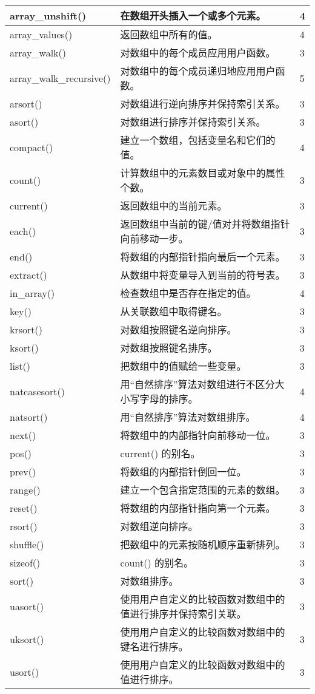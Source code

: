 \begin{longtable}{|m{120pt}|m{250pt}|m{20pt}|}
\hline
array\_unshift()					&在数组开头插入一个或多个元素。	&4\\
\hline
array\_values()					&返回数组中所有的值。	&4\\
\hline
array\_walk()					&对数组中的每个成员应用用户函数。	&3\\
\hline
array\_walk\_recursive()		&对数组中的每个成员递归地应用用户函数。	&5\\
\hline
arsort()							&对数组进行逆向排序并保持索引关系。	&3\\
\hline
asort()						&对数组进行排序并保持索引关系。	&3\\
\hline
compact()					&建立一个数组，包括变量名和它们的值。&	4\\
\hline
count()						&计算数组中的元素数目或对象中的属性个数。	&3\\
\hline
current()					&返回数组中的当前元素。	&3\\
\hline
each()						&返回数组中当前的键/值对并将数组指针向前移动一步。	&3\\
\hline
end()						&将数组的内部指针指向最后一个元素。	&3\\
\hline
extract()					&从数组中将变量导入到当前的符号表。	&3\\
\hline
in\_array()					&检查数组中是否存在指定的值。	&4\\
\hline
key()						&从关联数组中取得键名。	&3\\
\hline
krsort()						&对数组按照键名逆向排序。	&3\\
\hline
ksort()						&对数组按照键名排序。	&3\\
\hline
list()						&把数组中的值赋给一些变量。&	3\\
\hline
natcasesort()				&用“自然排序”算法对数组进行不区分大小写字母的排序。	&4\\
\hline
natsort()					&用“自然排序”算法对数组排序。	&4\\
\hline
next()						&将数组中的内部指针向前移动一位。&	3\\
\hline
pos()						&current() 的别名。	&3\\
\hline
prev()						&将数组的内部指针倒回一位。&	3\\
\hline
range()						&建立一个包含指定范围的元素的数组。	&3\\
\hline
reset()						&将数组的内部指针指向第一个元素。	&3\\
\hline
rsort()						&对数组逆向排序。	&3\\
\hline
shuffle()					&把数组中的元素按随机顺序重新排列。	&3\\
\hline
sizeof()						&count() 的别名。	&3\\
\hline
sort()						&对数组排序。	&3\\
\hline
uasort()						&使用用户自定义的比较函数对数组中的值进行排序并保持索引关联。	&3\\
\hline
uksort()						&使用用户自定义的比较函数对数组中的键名进行排序。	&3\\
\hline
usort()						&使用用户自定义的比较函数对数组中的值进行排序。	&3\\
\hline
\end{longtable}



